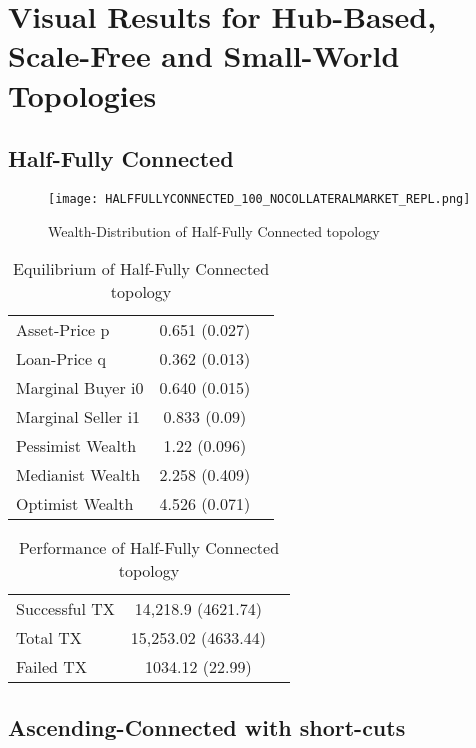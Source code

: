 \documentclass[Bachelorarbeit.tex]{subfiles}
\begin{document}
\graphicspath{{./figures/appendixResults/}}	%

\chapter{Visual Results for Hub-Based, Scale-Free and Small-World Topologies}
\label{app:results}

\section{Half-Fully Connected}
\begin{figure}[H]
	\centering
  \texttt{[image: HALFFULLYCONNECTED\_100\_NOCOLLATERALMARKET\_REPL.png]}
	\caption{Wealth-Distribution of Half-Fully Connected topology }
	\label{fig:wealth_HALFFULLYCONNECTED_100_NOCOLLATERALMARKET_REPL}
\end{figure}

\begin{table}[H]
	\caption{Equilibrium of Half-Fully Connected topology}
	\centering
	\begin{tabular} { l c r }
		\hline
		Asset-Price p & 0.651 (0.027) \\
		Loan-Price q & 0.362 (0.013) \\
		Marginal Buyer i0 & 0.640 (0.015) \\
		Marginal Seller i1 & 0.833 (0.09) \\
		\hline
		Pessimist Wealth & 1.22 (0.096) \\
		Medianist Wealth & 2.258 (0.409) \\
		Optimist Wealth & 4.526 (0.071) \\
		\hline
	\end{tabular}
\end{table} 

\begin{table}[H]
	\caption{Performance of Half-Fully Connected topology}
	\centering
	\begin{tabular} { l c r }
		\hline
		Successful TX & 14,218.9 (4621.74) \\
		Total TX & 15,253.02 (4633.44) \\
		Failed TX & 1034.12 (22.99) \\
		\hline
	\end{tabular}
\end{table}

\section{Ascending-Connected with short-cuts}
\end{document}
